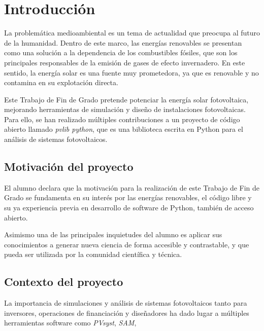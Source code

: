 \chapter{Introducción} \label{chp:intro}

La problemática medioambiental es un tema de actualidad que preocupa al futuro de la humanidad. Dentro de este marco, las energías renovables se presentan como una solución a la dependencia de los combustibles fósiles, que son los principales responsables de la emisión de gases de efecto invernadero. En este sentido, la energía solar es una fuente muy prometedora, ya que es renovable y no contamina en su explotación directa.

Este Trabajo de Fin de Grado pretende potenciar la energía solar fotovoltaica, mejorando herramientas de simulación y diseño de instalaciones fotovoltaicas. Para ello, se han realizado múltiples contribuciones a un proyecto de código abierto llamado \textit{pvlib python}, que es una biblioteca escrita en Python para el análisis de sistemas fotovoltaicos.


\section{Motivación del proyecto} \label{sct:intro:motivacion}

El alumno declara que la motivación para la realización de este Trabajo de Fin de Grado se fundamenta en su interés por las energías renovables, el código libre y su ya experiencia previa en desarrollo de software de Python, también de acceso abierto.

Asimismo una de las principales inquietudes del alumno es aplicar sus conocimientos a generar nueva ciencia de forma accesible y contrastable, y que pueda ser utilizada por la comunidad científica y técnica.


\section{Contexto del proyecto} \label{sct:intro:contexto}

La importancia de simulaciones y análisis de sistemas fotovoltaicos tanto para inversores, operaciones de financiación y diseñadores ha dado lugar a múltiples herramientas software como \textit{PVsyst}, \textit{SAM}, \text{}

